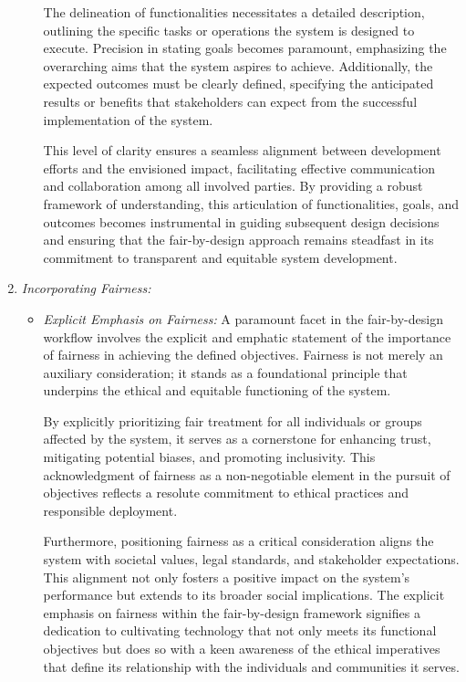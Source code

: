 \begin{enumerate}
\begin{itemize}
            The delineation of functionalities necessitates a detailed description, outlining the specific tasks or operations the system is designed to execute. Precision in stating goals becomes paramount, emphasizing the overarching aims that the system aspires to achieve. Additionally, the expected outcomes must be clearly defined, specifying the anticipated results or benefits that stakeholders can expect from the successful implementation of the system.
            
            This level of clarity ensures a seamless alignment between development efforts and the envisioned impact, facilitating effective communication and collaboration among all involved parties. By providing a robust framework of understanding, this articulation of functionalities, goals, and outcomes becomes instrumental in guiding subsequent design decisions and ensuring that the fair-by-design approach remains steadfast in its commitment to transparent and equitable system development.        
        
        \end{itemize}
    
    \item \emph{Incorporating Fairness:}

        \begin{itemize}
            
            \item \emph{Explicit Emphasis on Fairness:} A paramount facet in the fair-by-design workflow involves the explicit and emphatic statement of the importance of fairness in achieving the defined objectives. Fairness is not merely an auxiliary consideration; it stands as a foundational principle that underpins the ethical and equitable functioning of the system.

            By explicitly prioritizing fair treatment for all individuals or groups affected by the system, it serves as a cornerstone for enhancing trust, mitigating potential biases, and promoting inclusivity. This acknowledgment of fairness as a non-negotiable element in the pursuit of objectives reflects a resolute commitment to ethical practices and responsible deployment.
            
            Furthermore, positioning fairness as a critical consideration aligns the system with societal values, legal standards, and stakeholder expectations. This alignment not only fosters a positive impact on the system's performance but extends to its broader social implications. The explicit emphasis on fairness within the fair-by-design framework signifies a dedication to cultivating technology that not only meets its functional objectives but does so with a keen awareness of the ethical imperatives that define its relationship with the individuals and communities it serves.
                                    

\end{itemize}
\end{enumerate}
